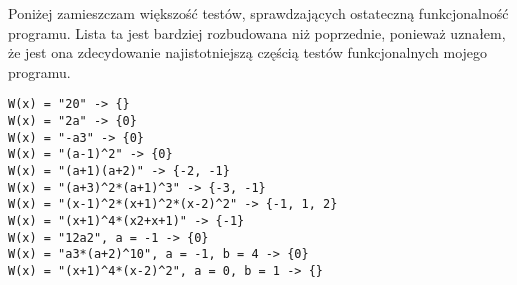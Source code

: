 \documentclass[twoside,a4paper]{book}
\begin{document}
Poniżej zamieszczam większość testów, sprawdzających ostateczną funkcjonalność programu. Lista ta jest bardziej rozbudowana niż poprzednie, ponieważ uznałem, że jest ona zdecydowanie najistotniejszą częścią testów funkcjonalnych mojego programu.

\begin{lstlisting}
W(x) = "20" -> {}
W(x) = "2a" -> {0}
W(x) = "-a3" -> {0}
W(x) = "(a-1)^2" -> {0}
W(x) = "(a+1)(a+2)" -> {-2, -1}
W(x) = "(a+3)^2*(a+1)^3" -> {-3, -1}
W(x) = "(x-1)^2*(x+1)^2*(x-2)^2" -> {-1, 1, 2}
W(x) = "(x+1)^4*(x2+x+1)" -> {-1}
W(x) = "12a2", a = -1 -> {0}
W(x) = "a3*(a+2)^10", a = -1, b = 4 -> {0}
W(x) = "(x+1)^4*(x-2)^2", a = 0, b = 1 -> {}
\end{lstlisting}





\backmatter



\nocite{barbeau2003polynomials}
\nocite{buell2004algorithmic}
\nocite{burden2015numerical}
\nocite{childs2012concrete}
\nocite{granlund2015gnu}
\nocite{kryszewski2014wyklad}
\nocite{malik2009data}
\nocite{mcnamee2007numerical}
\nocite{mora2003solving}
\nocite{pan2012structured}
\nocite{polskie1968wiadomosci}
\nocite{sierpinski1951zasady}
\nocite{Warmus_Mieczyslaw_(1918-2007)_Metody}

\end{document}
